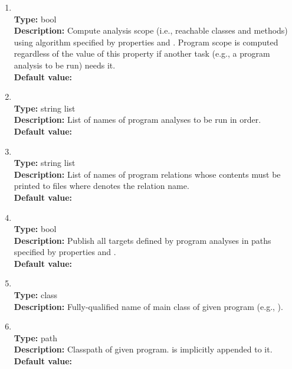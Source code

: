 \begin{enumerate}
\item
{} \\
{\bf Type:} bool \\
{\bf Description:} Compute analysis scope (i.e., reachable classes and methods) using algorithm specified by properties  and .
Program scope is computed regardless of the value of this property if another task (e.g., a program analysis to be run) needs it. \\
{\bf Default value:} 

\item
{} \\
{\bf Type:} string list \\
{\bf Description:} List of names of program analyses to be run in order. \\
{\bf Default value:}  

\item
{} \\
{\bf Type:} string list \\
{\bf Description:} List of names of program relations whose contents must be printed to files  where  denotes the relation name.  \\
{\bf Default value:}  

\item
{} \\
{\bf Type:} bool \\
{\bf Description:} Publish all targets defined by program analyses in paths specified by properties  and . \\
{\bf Default value:} 

\item
{} \\
{\bf Type:} class \\
{\bf Description:} Fully-qualified name of main class of given program (e.g., ).

\item
{} \\
{\bf Type:} path \\
{\bf Description:} Classpath of given program.  is implicitly appended to it. \\
{\bf Default value:}  


\end{enumerate}
